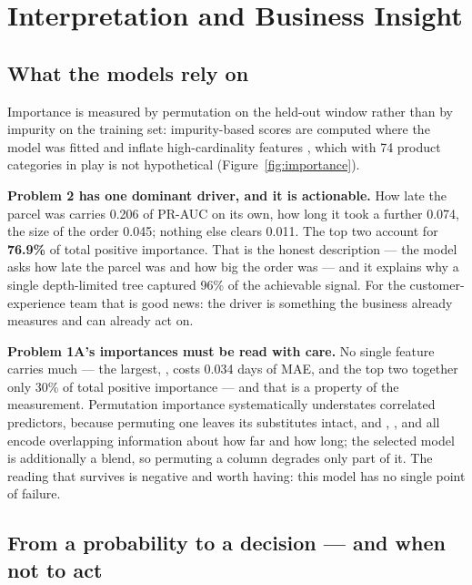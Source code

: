 \section{Interpretation and Business Insight}
\label{sec:insight}

\subsection{What the models rely on}

Importance is measured by permutation on the held-out window rather than by
impurity on the training set: impurity-based scores are computed where the model
was fitted and inflate high-cardinality features \citep{strobl2007importance},
which with 74 product categories in play is not hypothetical
(Figure~\ref{fig:importance}).

\textbf{Problem 2 has one dominant driver, and it is actionable.} How late the
parcel was carries 0.206 of PR-AUC on its own, how long it took a further 0.074,
the size of the order 0.045; nothing else clears 0.011. The top two account for
\textbf{76.9\%} of total positive importance. That is the honest description ---
the model asks how late the parcel was and how big the order was --- and it
explains why a single depth-limited tree captured 96\% of the achievable signal.
For the customer-experience team that is good news: the driver is something the
business already measures and can already act on.

\textbf{Problem 1A's importances must be read with care.} No single feature
carries much --- the largest, , costs 0.034 days of
MAE, and the top two together only 30\% of total positive importance --- and that
is a property of the measurement. Permutation importance systematically
understates correlated predictors, because permuting one leaves its substitutes
intact, and , ,
 and  all encode overlapping
information about how far and how long; the selected model is additionally a
blend, so permuting a column degrades only part of it. The reading that survives
is negative and worth having: this model has no single point of failure.

\subsection{From a probability to a decision --- and when not to act}
\label{sec:cost}

